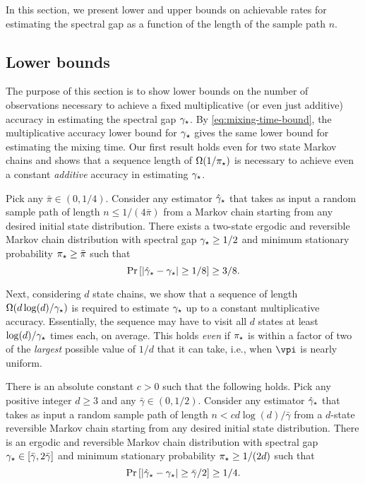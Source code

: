 In this section, we present lower and upper bounds on achievable rates
for estimating the spectral gap as a function of the length of the
sample path $n$.

\subsection{Lower bounds}
\label{sec:rates-lower}
The purpose of this section is to show lower bounds on the number of observations
necessary to achieve a fixed multiplicative (or even just additive) accuracy in estimating the spectral gap $\gamma_{\star}$.
By \cref{eq:mixing-time-bound}, the multiplicative accuracy lower bound for $\gamma_{\star}$
gives the same lower bound for estimating the mixing time.
Our first result holds even for two state Markov chains and shows that a sequence length of $\Omega(1/\pi_{\star})$
is necessary to achieve even a constant \emph{additive} accuracy in estimating $\gamma_{\star}$.
\begin{theorem}
  \label{thm:lb-pimin}
  Pick any $\bar\pi \in (0,1/4)$.
  Consider any estimator $\hat\gamma_{\star}$ that takes as input a random sample
  path of length $n \leq 1/(4\bar\pi)$ from a Markov chain starting
  from any desired initial state distribution.
  There exists a two-state ergodic and reversible Markov chain
  distribution with spectral gap $\gamma_{\star} \geq 1/2$ and minimum
  stationary probability $\pi_{\star} \geq \bar\pi$ such that
  \[
    \Pr\left[ |\hat\gamma_{\star} - \gamma_{\star}| \geq 1/8 \right] \geq 3/8 .
  \]
\end{theorem}
Next, considering $d$ state chains, we show that 
a sequence of length $\Omega(d\log(d)/\gamma_{\star})$ is required
to estimate $\gamma_{\star}$ up to a constant multiplicative accuracy.
Essentially, the sequence may have to visit all $d$ states at least
$\log(d)/\gamma_{\star}$ times each, on average.
This holds \emph{even} if $\pi_{\star}$ is within a factor of two of the
\emph{largest} possible value of $1/d$ that it can take, i.e., when
$\vpi$ is nearly uniform.
\begin{theorem}
  \label{thm:lb-gap}
  There is an absolute constant $c>0$ such that the following holds.
  Pick any positive integer $d \geq 3$ and any $\bar\gamma \in
  (0,1/2)$.
  Consider any estimator $\hat\gamma_{\star}$ that takes as input a random sample
  path of length $n < c d\log(d) / \bar\gamma$ from a $d$-state
  reversible Markov chain starting from any desired initial state
  distribution.
  There is an ergodic and reversible Markov chain distribution
  with spectral gap $\gamma_{\star} \in [\bar\gamma,2\bar\gamma]$ and minimum
  stationary probability $\pi_{\star} \geq 1/(2d)$ such that
  \[
    \Pr\left[ |\hat\gamma_{\star} - \gamma_{\star}| \geq \bar\gamma/2\right] \geq 1/4 .
  \]
\end{theorem}


